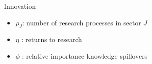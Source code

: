 \documentclass[11pt,aspectratio=169]{beamer}
\begin{document}
\begin{frame}{Innovation}
\begin{minipage}[t!]{0.43\textwidth}
\begin{itemize}
		\end{itemize}
	\end{minipage}
	\vspace{-5mm}
	\begin{minipage}[t!]{0.55\textwidth}
		\vspace{0mm}
		\begin{itemize}	
			\item[] $\rho_J$: number of research processes in sector $J$
			\vspace{-2mm}			
			\item[] $\eta$ : returns to research
			\vspace{-2mm}			
			\item[] $\phi$ : relative importance knowledge spillovers
		\end{itemize}
	\end{minipage}
\end{frame}
\end{document}

